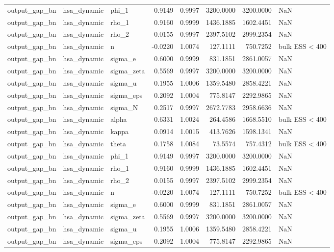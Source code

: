 \begin{tabular}{lllrrrrl}
output\_gap\_bn & hsa\_dynamic & phi\_1 & 0.9149 & 0.9997 & 3200.0000 & 3200.0000 & NaN \\
output\_gap\_bn & hsa\_dynamic & rho\_1 & 0.9160 & 0.9999 & 1436.1885 & 1602.4451 & NaN \\
output\_gap\_bn & hsa\_dynamic & rho\_2 & 0.0155 & 0.9997 & 2397.5102 & 2999.2354 & NaN \\
output\_gap\_bn & hsa\_dynamic & n & -0.0220 & 1.0074 & 127.1111 & 750.7252 & bulk ESS < 400 \\
output\_gap\_bn & hsa\_dynamic & sigma\_e & 0.6000 & 0.9999 & 831.1851 & 2861.0057 & NaN \\
output\_gap\_bn & hsa\_dynamic & sigma\_zeta & 0.5569 & 0.9997 & 3200.0000 & 3200.0000 & NaN \\
output\_gap\_bn & hsa\_dynamic & sigma\_u & 0.1955 & 1.0006 & 1359.5480 & 2858.4221 & NaN \\
output\_gap\_bn & hsa\_dynamic & sigma\_eps & 0.2092 & 1.0004 & 775.8147 & 2292.9865 & NaN \\
output\_gap\_bn & hsa\_dynamic & sigma\_N & 0.2517 & 0.9997 & 2672.7783 & 2958.6636 & NaN \\
output\_gap\_bn & hsa\_dynamic & alpha & 0.6331 & 1.0024 & 264.4586 & 1668.5510 & bulk ESS < 400 \\
output\_gap\_bn & hsa\_dynamic & kappa & 0.0914 & 1.0015 & 413.7626 & 1598.1341 & NaN \\
output\_gap\_bn & hsa\_dynamic & theta & 0.1758 & 1.0084 & 73.5574 & 757.4312 & bulk ESS < 400 \\
output\_gap\_bn & hsa\_dynamic & phi\_1 & 0.9149 & 0.9997 & 3200.0000 & 3200.0000 & NaN \\
output\_gap\_bn & hsa\_dynamic & rho\_1 & 0.9160 & 0.9999 & 1436.1885 & 1602.4451 & NaN \\
output\_gap\_bn & hsa\_dynamic & rho\_2 & 0.0155 & 0.9997 & 2397.5102 & 2999.2354 & NaN \\
output\_gap\_bn & hsa\_dynamic & n & -0.0220 & 1.0074 & 127.1111 & 750.7252 & bulk ESS < 400 \\
output\_gap\_bn & hsa\_dynamic & sigma\_e & 0.6000 & 0.9999 & 831.1851 & 2861.0057 & NaN \\
output\_gap\_bn & hsa\_dynamic & sigma\_zeta & 0.5569 & 0.9997 & 3200.0000 & 3200.0000 & NaN \\
output\_gap\_bn & hsa\_dynamic & sigma\_u & 0.1955 & 1.0006 & 1359.5480 & 2858.4221 & NaN \\
output\_gap\_bn & hsa\_dynamic & sigma\_eps & 0.2092 & 1.0004 & 775.8147 & 2292.9865 & NaN \\

\end{tabular}
